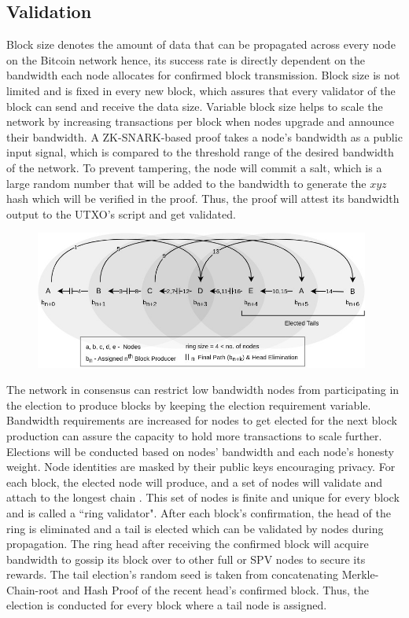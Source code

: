 \documentclass[a4paper,	10pt]{extarticle}
\begin{document}
\subsection{Validation}
Block size denotes the amount of data that can be propagated across every node on the Bitcoin network hence, its success rate is directly dependent on the bandwidth each node allocates for confirmed block transmission. Block size is not limited and is fixed in every new block, which assures that every validator of the block can send and receive the data size. Variable block size helps to scale the network by increasing transactions per block when nodes upgrade and announce their bandwidth. A ZK-SNARK-based proof takes a node’s bandwidth as a public input signal, which is compared to the threshold range of the desired bandwidth of the network. To prevent tampering, the node will commit a salt, which is a large random number that will be added to the bandwidth to generate the $xyz$ hash which will be verified in the proof. Thus, the proof will attest its bandwidth output to the UTXO’s script and get validated.\\
\begin{figure}[H]
\begin{center}
\includegraphics[width=11cm]{ring}
\end{center}
\end{figure}
The network in consensus can restrict low bandwidth nodes from participating in the election to produce blocks by keeping the election requirement variable. Bandwidth requirements are increased for nodes to get elected for the next block production can assure the capacity to hold more transactions to scale further. Elections will be conducted based on nodes' bandwidth and each node's honesty weight. Node identities are masked by their public keys encouraging privacy. For each block, the elected node will produce, and a set of nodes will validate and attach to the longest chain \cite{nakamoto2008bitcoin}. This set of nodes is finite and unique for every block and is called a ``ring validator". After each block's confirmation, the head of the ring is eliminated and a tail is elected which can be validated by nodes during propagation. The ring head after receiving the confirmed block will acquire bandwidth to gossip its block over to other full or SPV nodes to secure its rewards. The tail election's random seed is taken from concatenating Merkle-Chain-root and Hash Proof \cite{yakovenko2018solana} of the recent head's confirmed block. Thus, the election is conducted for every block where a tail node is assigned.
\end{document}
